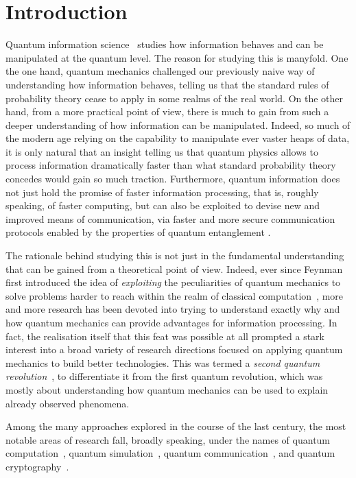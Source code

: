 
\chapter{Introduction}
\label{chapter:introduction}

Quantum information science~\cite{nielsen2006quantum,watrous2018theory} studies how information behaves and can be manipulated at the quantum level.
The reason for studying this is manyfold. One the one hand, quantum mechanics challenged our previously naive way of understanding how information behaves, telling us that the standard rules of probability theory cease to apply in some realms of the real world.
On the other hand, from a more practical point of view, there is much to gain from such a deeper understanding of how information can be manipulated. Indeed, so much of the modern age relying on the capability to manipulate ever vaster heaps of data, it is only natural that an insight telling us that quantum physics allows to process information dramatically faster than what standard probability theory concedes would gain so much traction.
Furthermore, quantum information does not just hold the promise of faster information processing, that is, roughly speaking, of faster computing, but can also be exploited to devise new and improved means of communication, via faster and more secure communication protocols enabled by the properties of quantum entanglement .

The rationale behind studying this is not just in the fundamental understanding that can be gained from a theoretical point of view. Indeed, ever since Feynman first introduced the idea of \emph{exploiting} the peculiarities of quantum mechanics to solve problems harder to reach within the realm of classical computation~\cite{feynman1982simulating}, more and more research has been devoted into trying to understand exactly why and how quantum mechanics can provide advantages for information processing.
In fact, the realisation itself that this feat was possible at all prompted a stark interest into a broad variety of research directions focused on applying quantum mechanics to build better technologies. This was termed a \textit{second quantum revolution}~\cite{dowling2003quantum}, to differentiate it from the first quantum revolution, which was mostly about understanding how quantum mechanics can be used to explain already observed phenomena.

Among the many approaches explored in the course of the last century, the most notable areas of research fall, broadly speaking, under the names of quantum computation~\cite{shor1997polynomial,steane1998quantum,ladd2010quantum}, quantum simulation~\cite{lloyd1996universal,georgescu2014quantum,koch2019quantum}, quantum communication~\cite{bennett1993teleporting}, and quantum cryptography~\cite{bennett2014quantum}.

